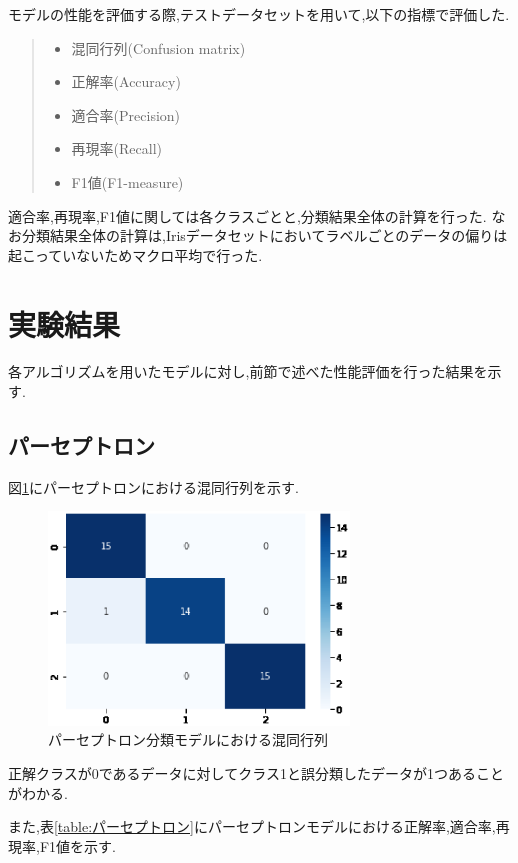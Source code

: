 \documentclass[twocolumn]{jarticle}     %
\begin{document}
モデルの性能を評価する際,テストデータセットを用いて,以下の指標で評価した.

\begin{quote}
  \begin{itemize}
    \item 混同行列(Confusion matrix)
   \item 正解率(Accuracy)
   \item 適合率(Precision)
   \item 再現率(Recall)
   \item F1値(F1-measure)
  \end{itemize}
 \end{quote}
 適合率,再現率,F1値に関しては各クラスごとと,分類結果全体の計算を行った.
なお分類結果全体の計算は,Irisデータセットにおいてラベルごとのデータの偏りは起こっていないためマクロ平均で行った.\cite{macro}

\section{実験結果}
各アルゴリズムを用いたモデルに対し,前節で述べた性能評価を行った結果を示す.
\subsection*{パーセプトロン}

図\ref{fig:パーセプトロン}にパーセプトロンにおける混同行列を示す.

\begin{figure}[ht]
  \centering
  \includegraphics[width=80mm]{assets/ppn_heatmap.eps}
  \caption{パーセプトロン分類モデルにおける混同行列}
  \label{fig:パーセプトロン}
\end{figure}

正解クラスが0であるデータに対してクラス1と誤分類したデータが1つあることがわかる.\par
また,表\ref{table:パーセプトロン}にパーセプトロンモデルにおける正解率,適合率,再現率,F1値を示す.
\end{document}
